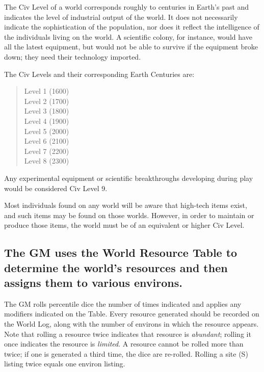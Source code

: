 The Civ Level of a world corresponds roughly to centuries in Earth's
past and indicates the level of industrial output of the world. It
does not necessarily indicate the sophistication of the population,
nor does it reflect the intelligence of the individuals living on the
world. A scientific colony, for instance, would have all the latest
equipment, but would not be able to survive if the equipment broke
down; they need their technology imported.

\pagebreak[2]

The Civ Levels and their corresponding Earth Centuries are: 

\begin{quote}
  Level 1 (1600) \\
  Level 2 (1700) \\
  Level 3 (1800) \\
  Level 4 (1900) \\
  Level 5 (2000) \\
  Level 6 (2100) \\
  Level 7 (2200) \\
  Level 8 (2300)
\end{quote} 

Any experimental equipment or scientific breakthroughs developing
during play would be considered Civ Level 9.

Most individuals found on any world will be aware that high-tech items
exist, and such items may be found on those worlds. However, in order
to maintain or produce those items, the world must be of an equivalent
or higher Civ Level.

\subsection[World Resource Table]{The GM uses the World Resource
  Table to determine the world's resources and then assigns them to
  various environs.}
\label{sec:world-resource-table}

The GM rolls percentile dice the number of times indicated and applies
any modifiers indicated on the Table. Every resource generated should
be recorded on the World Log, along with the number of environs in
which the resource appears. Note that rolling a resource twice
indicates that resource is \emph{abundant}; rolling it once indicates
the resource is \emph{limited}. A resource cannot be rolled more than
twice; if one is generated a third time, the dice are re-rolled.
Rolling a site (S) listing twice equals one environ listing.

